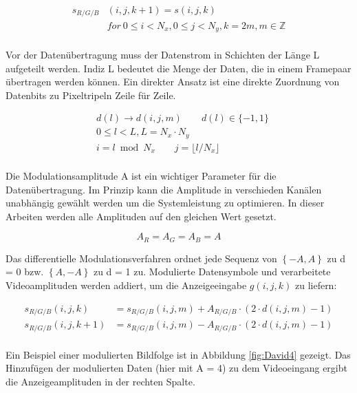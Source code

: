 \begin{equation}
\begin{split}
 s_{R/G/B}&(i,j,k+1) = s(i,j,k) \\
          &  for \ 0\le i <N_x, 0\le j<N_y,k=2m , m \in \mathbb{Z}\\
\end{split}
\end{equation}

Vor der Datenübertragung muss der Datenstrom in Schichten der Länge L aufgeteilt werden. Indiz L bedeutet die Menge der Daten, die in einem Framepaar übertragen werden können. Ein direkter Ansatz ist eine direkte Zuordnung von Datenbits zu Pixeltripeln Zeile für Zeile.

\begin{equation}
\begin{split}
  & d(l)\rightarrow d(i,j,m) \qquad d(l)\in \{-1,1\} \\
  & 0\le l <L,L = N_x \cdot N_y \\
  & i=l \bmod N_x \qquad j=\lfloor l/N_x \rfloor \\
\end{split}
\end{equation}

Die Modulationsamplitude A ist ein wichtiger Parameter für die Datenübertragung. Im Prinzip kann die Amplitude in verschieden Kanälen unabhängig gewählt werden um die Systemleistung zu optimieren. In dieser Arbeiten werden alle Amplituden auf den gleichen Wert gesetzt.

\begin{equation}
 A_R=A_G=A_B=A        
\end{equation}

Das differentielle Modulationsverfahren ordnet jede Sequenz von $\left\{-A, A\right\}$ zu d = 0 bzw. $\left\{A, -A\right\}$ zu d = 1 zu. Modulierte Datensymbole und verarbeitete Videoamplituden werden addiert, um die Anzeigeeingabe $g(i,j,k)$ zu liefern:

\begin{equation}
\begin{split}
   s_{R/G/B}(i,j,k)  &= s_{R/G/B}(i,j,m) + A_{R/G/B} \cdot \left( 2 \cdot d(i,j,m) - 1 \right) \\
   s_{R/G/B}(i,j,k+1)&= s_{R/G/B}(i,j,m) - A_{R/G/B} \cdot \left( 2 \cdot d(i,j,m) - 1 \right) \\
\end{split}
\end{equation}

Ein Beispiel einer modulierten Bildfolge ist in Abbildung \ref{fig:David4} gezeigt. Das Hinzufügen der modulierten Daten (hier mit A = 4) zu dem Videoeingang ergibt die Anzeigeamplituden in der rechten Spalte.
\newpage

